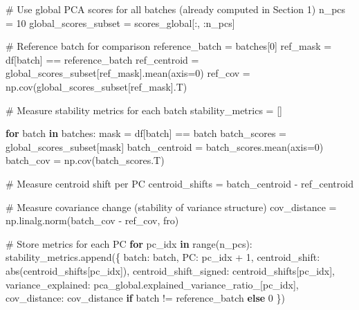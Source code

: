 \documentclass[
  letterpaper,
  DIV=11,
  numbers=noendperiod]{scrartcl}
\newenvironment{Shaded}{\begin{snugshade}}{\end{snugshade}}
\newcommand{\BuiltInTok}[1]{\textcolor[rgb]{0.00,0.23,0.31}{#1}}
\newcommand{\CommentTok}[1]{\textcolor[rgb]{0.37,0.37,0.37}{#1}}
\newcommand{\ControlFlowTok}[1]{\textcolor[rgb]{0.00,0.23,0.31}{\textbf{#1}}}
\newcommand{\DecValTok}[1]{\textcolor[rgb]{0.68,0.00,0.00}{#1}}
\newcommand{\KeywordTok}[1]{\textcolor[rgb]{0.00,0.23,0.31}{\textbf{#1}}}
\newcommand{\NormalTok}[1]{\textcolor[rgb]{0.00,0.23,0.31}{#1}}
\newcommand{\OperatorTok}[1]{\textcolor[rgb]{0.37,0.37,0.37}{#1}}
\newcommand{\StringTok}[1]{\textcolor[rgb]{0.13,0.47,0.30}{#1}}
\renewenvironment{Shaded}{%
  \begin{tcolorbox}[%
    enhanced,%
    colback=codebg,%
    colframe=codebg,%
    borderline west={3pt}{0pt}{sectionblue},%
    fontupper=\small\ttfamily,%
    boxrule=0pt,%
    arc=0pt,%
    boxsep=5pt,%
    left=2mm,%
    right=2mm,%
    top=2mm,%
    bottom=2mm%
  ]%
}{%
  \end{tcolorbox}%
}
\begin{document}
\begin{Shaded}
\begin{Highlighting}[]
\CommentTok{\# Use global PCA scores for all batches (already computed in Section 1)}
\NormalTok{n\_pcs }\OperatorTok{=} \DecValTok{10}
\NormalTok{global\_scores\_subset }\OperatorTok{=}\NormalTok{ scores\_global[:, :n\_pcs]}

\CommentTok{\# Reference batch for comparison}
\NormalTok{reference\_batch }\OperatorTok{=}\NormalTok{ batches[}\DecValTok{0}\NormalTok{]}
\NormalTok{ref\_mask }\OperatorTok{=}\NormalTok{ df[}\StringTok{\textquotesingle{}batch\textquotesingle{}}\NormalTok{] }\OperatorTok{==}\NormalTok{ reference\_batch}
\NormalTok{ref\_centroid }\OperatorTok{=}\NormalTok{ global\_scores\_subset[ref\_mask].mean(axis}\OperatorTok{=}\DecValTok{0}\NormalTok{)}
\NormalTok{ref\_cov }\OperatorTok{=}\NormalTok{ np.cov(global\_scores\_subset[ref\_mask].T)}

\CommentTok{\# Measure stability metrics for each batch}
\NormalTok{stability\_metrics }\OperatorTok{=}\NormalTok{ []}

\ControlFlowTok{for}\NormalTok{ batch }\KeywordTok{in}\NormalTok{ batches:}
\NormalTok{    mask }\OperatorTok{=}\NormalTok{ df[}\StringTok{\textquotesingle{}batch\textquotesingle{}}\NormalTok{] }\OperatorTok{==}\NormalTok{ batch}
\NormalTok{    batch\_scores }\OperatorTok{=}\NormalTok{ global\_scores\_subset[mask]}
\NormalTok{    batch\_centroid }\OperatorTok{=}\NormalTok{ batch\_scores.mean(axis}\OperatorTok{=}\DecValTok{0}\NormalTok{)}
\NormalTok{    batch\_cov }\OperatorTok{=}\NormalTok{ np.cov(batch\_scores.T)}
    
    \CommentTok{\# Measure centroid shift per PC}
\NormalTok{    centroid\_shifts }\OperatorTok{=}\NormalTok{ batch\_centroid }\OperatorTok{{-}}\NormalTok{ ref\_centroid}
    
    \CommentTok{\# Measure covariance change (stability of variance structure)}
\NormalTok{    cov\_distance }\OperatorTok{=}\NormalTok{ np.linalg.norm(batch\_cov }\OperatorTok{{-}}\NormalTok{ ref\_cov, }\StringTok{\textquotesingle{}fro\textquotesingle{}}\NormalTok{)}
    
    \CommentTok{\# Store metrics for each PC}
    \ControlFlowTok{for}\NormalTok{ pc\_idx }\KeywordTok{in} \BuiltInTok{range}\NormalTok{(n\_pcs):}
\NormalTok{        stability\_metrics.append(\{}
            \StringTok{\textquotesingle{}batch\textquotesingle{}}\NormalTok{: batch,}
            \StringTok{\textquotesingle{}PC\textquotesingle{}}\NormalTok{: pc\_idx }\OperatorTok{+} \DecValTok{1}\NormalTok{,}
            \StringTok{\textquotesingle{}centroid\_shift\textquotesingle{}}\NormalTok{: }\BuiltInTok{abs}\NormalTok{(centroid\_shifts[pc\_idx]),}
            \StringTok{\textquotesingle{}centroid\_shift\_signed\textquotesingle{}}\NormalTok{: centroid\_shifts[pc\_idx],}
            \StringTok{\textquotesingle{}variance\_explained\textquotesingle{}}\NormalTok{: pca\_global.explained\_variance\_ratio\_[pc\_idx],}
            \StringTok{\textquotesingle{}cov\_distance\textquotesingle{}}\NormalTok{: cov\_distance }\ControlFlowTok{if}\NormalTok{ batch }\OperatorTok{!=}\NormalTok{ reference\_batch }\ControlFlowTok{else} \DecValTok{0}
\NormalTok{        \})}


\end{Highlighting}
\end{Shaded}
\end{document}
